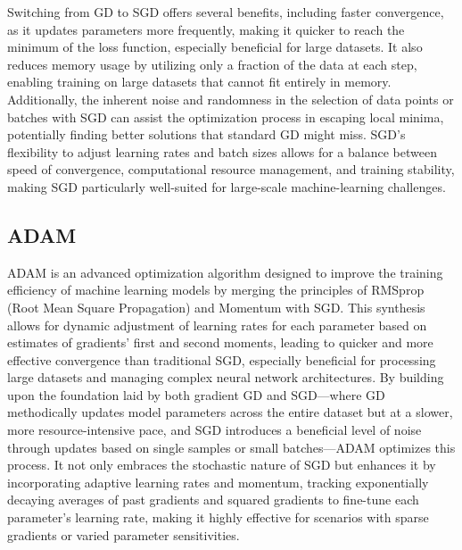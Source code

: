\documentclass[oneside]{article}
\begin{document}
Switching from GD to SGD offers several benefits, including faster convergence, as it updates parameters more frequently, making it quicker to reach the minimum of the loss function, especially beneficial for large datasets. It also reduces memory usage by utilizing only a fraction of the data at each step, enabling training on large datasets that cannot fit entirely in memory. Additionally, the inherent noise and randomness in the selection of data points or batches with SGD can assist the optimization process in escaping local minima, potentially finding better solutions that standard GD might miss. SGD's flexibility to adjust learning rates and batch sizes allows for a balance between speed of convergence, computational resource management, and training stability, making SGD particularly well-suited for large-scale machine-learning challenges.


\subsection{ADAM}
ADAM is an advanced optimization algorithm designed to improve the training efficiency of machine learning models by merging the principles of RMSprop (Root Mean Square Propagation) and Momentum with SGD. This synthesis allows for dynamic adjustment of learning rates for each parameter based on estimates of gradients' first and second moments, leading to quicker and more effective convergence than traditional SGD, especially beneficial for processing large datasets and managing complex neural network architectures. By building upon the foundation laid by both gradient GD and SGD—where GD methodically updates model parameters across the entire dataset but at a slower, more resource-intensive pace, and SGD introduces a beneficial level of noise through updates based on single samples or small batches—ADAM optimizes this process. It not only embraces the stochastic nature of SGD but enhances it by incorporating adaptive learning rates and momentum, tracking exponentially decaying averages of past gradients and squared gradients to fine-tune each parameter's learning rate, making it highly effective for scenarios with sparse gradients or varied parameter sensitivities.
\end{document}
